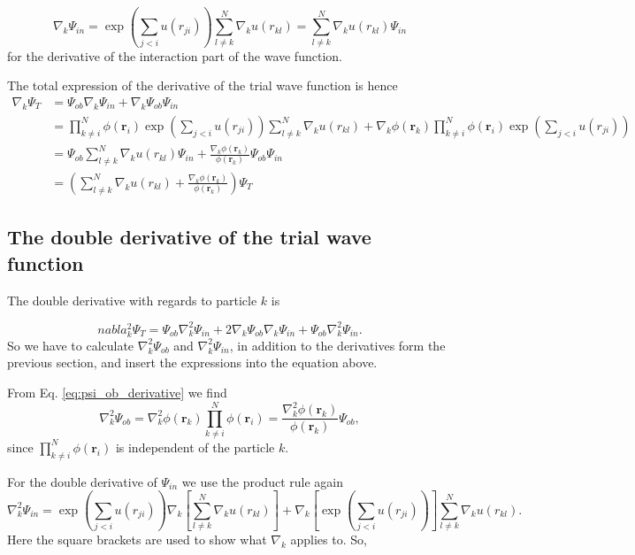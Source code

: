 \begin{equation}\label{eq:psi_in_derivative}
\nabla_k\Psi_{in} = \exp{\left(\sum_{j<i}u(r_{ji})\right)} \sum^N_{l \neq k} \nabla_k u (r_{kl}) = \sum^N_{l \neq k} \nabla_k u (r_{kl}) \Psi_{in}
\end{equation}
for the derivative of the interaction part of the wave function.

The total expression of the derivative of the trial wave function is hence 
\begin{align}
\nabla_k \Psi_T &= \Psi_{ob}\nabla_k\Psi_{in} + \nabla_k\Psi_{ob}\Psi_{in}\\
 &= \prod_{k\neq i}^N \phi(\mathbf{r}_i)\exp{\left(\sum_{j<i}u(r_{ji})\right)} \sum^N_{l \neq k} \nabla_k u (r_{kl}) + \nabla_k \phi(\mathbf{r}_k)\prod_{k\neq i}^N \phi(\mathbf{r}_i) \exp{\left(\sum_{j<i}u(r_{ji})\right)}\\
 &= \Psi_{ob}\sum^N_{l \neq k} \nabla_k u (r_{kl}) \Psi_{in}+ \frac{\nabla_k \phi(\mathbf{r}_k)}{\phi(\mathbf{r}_k)} \Psi_{ob}\Psi_{in}\\
 &= \left(\sum^N_{l \neq k} \nabla_k u (r_{kl})+ \frac{\nabla_k \phi(\mathbf{r}_k)}{\phi(\mathbf{r}_k)}\right) \Psi_T 
\end{align}

\subsection{The double derivative of the trial wave function}

The double derivative with regards to particle $k$ is

\begin{equation}\label{eq:total_double_start}
nabla^2_k \Psi_T =  \Psi_{ob}\nabla^2_k\Psi_{in} + 2\nabla_k\Psi_{ob}\nabla_k\Psi_{in} + \Psi_{ob}\nabla^2_k\Psi_{in}.
\end{equation}
So we have to calculate $\nabla^2_k\Psi_{ob}$ and $\nabla^2_k\Psi_{in}$, in addition to the derivatives form the previous section, and insert the expressions into the equation above.

From Eq. \ref{eq:psi_ob_derivative} we find
$$ \nabla^2_k\Psi_{ob} = \nabla^2_k \phi(\mathbf{r}_k)\prod_{k\neq i}^N \phi(\mathbf{r}_i) = \frac{\nabla^2_k \phi(\mathbf{r}_k)}{\phi(\mathbf{r}_k)} \Psi_{ob},$$
since $\prod_{k\neq i}^N \phi(\mathbf{r}_i)$ is independent of the particle $k$.

For the double derivative of $\Psi_{in}$ we use the product rule again
\begin{equation}\label{eq:double_derivative_start}
\nabla^2_k\Psi_{in} = \exp{\left(\sum_{j<i}u(r_{ji})\right)} \nabla_k\left[ \sum^N_{l \neq k} \nabla_k u (r_{kl})\right] +\nabla_k\left[ \exp{\left(\sum_{j<i}u(r_{ji})\right)}\right] \sum^N_{l \neq k} \nabla_k u (r_{kl}).
\end{equation}
Here the square brackets are used to show what $\nabla_k$ applies to. So,

